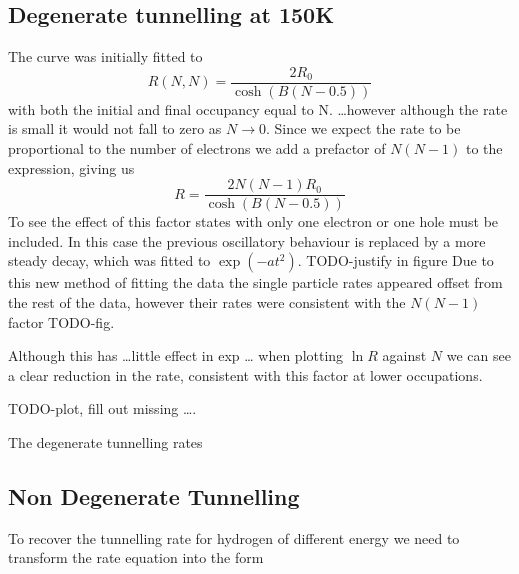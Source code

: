 \subsection{Degenerate tunnelling at 150K}


The curve was initially fitted to
\begin{equation}
    R(N, N) = \frac{2R_0}{\cosh{(B(N - 0.5))}}
\end{equation}
with both the initial and final occupancy
equal to N. \ldots however although the rate is small it
would not fall to zero as \(N \rightarrow 0\).
Since we expect the rate to be proportional to the
number of electrons we add a prefactor of \(N(N-1)\)
to the expression, giving us
\begin{equation}
    R = \frac{2 N(N-1) R_0}{\cosh{(B(N - 0.5))}}
\end{equation}
To see the effect of this factor
states with only
one electron or one hole must be included.
In this
case the previous
oscillatory behaviour is replaced
by a more steady decay, which was fitted to
\(\exp{(-at^2)}\). TODO-justify in figure Due to this new
method of fitting the data the
single particle rates appeared
offset from the rest of the data,
however their rates were consistent
with the \(N(N-1)\) factor TODO-fig.

Although this has \ldots little effect in exp \ldots
when plotting \(\ln{R}\) against \(N\) we can see a
clear reduction in the rate, consistent with this factor
at lower occupations.

TODO-plot, fill out missing \ldots.

The degenerate tunnelling rates

\subsection{Non Degenerate Tunnelling}
To recover the tunnelling rate for hydrogen of different
energy we need to transform the rate equation
into the form

